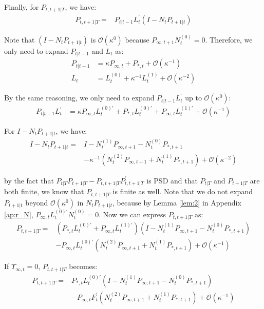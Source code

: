 \documentclass[10pt, titlepage]{article}
\numberwithin{equation}{section}
\begin{document}
Finally, for $P_{t,t+1|T}$, we have:
\begin{align*}
    P_{t,t+1|T} =& P_{t|t-1}L_t^{'}(I-N_tP_{t+1|t})
\end{align*}

Note that $(I-N_tP_{t+1|t})$ is $\mathcal{O}(\kappa^0)$ because $P_{\infty,t+1}N_{t}^{(0)}=0$. Therefore, we only need to expand $P_{t|t-1}$ and $L_t$ as:
\begin{align*}
    P_{t|t-1} &= \kappa P_{\infty,t} + P_{*,t} + \mathcal{O}(\kappa^{-1}) \\
    L_t &= L_t^{(0)} + \kappa^{-1}L_t^{(1)} + \mathcal{O}(\kappa^{-2})
\end{align*}

By the same reasoning, we only need to expand $P_{t|t-1}L_t^{'}$ up to $\mathcal{O}(\kappa^0)$:
\begin{align*}
    P_{t|t-1}L_t^{'} &= \kappa P_{\infty,t}L_t^{(0)'}+P_{*,t}L_t^{(0)'}+P_{\infty,t}L_t^{(1)'}+\mathcal{O}(\kappa^{-1})
\end{align*}

For $I-N_tP_{t+1|t}$, we have:
\begin{align*}
    I-N_tP_{t+1|t} =& I-N_t^{(1)}P_{\infty,t+1}-N_t^{(0)}P_{*,t+1} \\
    &-\kappa^{-1}(N_t^{(2)}P_{\infty,t+1}+N_t^{(1)}P_{*,t+1})+\mathcal{O}(\kappa^{-2})
\end{align*}

by the fact that $P_{t|T}P_{t+1|T}-P_{t,t+1|T}P_{t,t+1|T}^{'}$ is PSD and that $P_{t|T}$ and $P_{t+1|T}$ are both finite, we know that $P_{t,t+1|T}$ is finite as well. Note that we do not expand $P_{t+1|t}$ beyond $\mathcal{O}(\kappa^0)$ in $N_tP_{t+1|t}$, because by Lemma \ref{lem:2} in Appendix \ref{ap:r_N}, $P_{\infty,t}L_t^{(0)'}N_t^{(0)}=0$. Now we can express $P_{t,t+1|T}$ as:
\begin{align*}
    P_{t,t+1|T} =& (P_{*,t}L_t^{(0)'}+P_{\infty,t}L_t^{(1)'})(I-N_t^{(1)}P_{\infty,t+1}-N_t^{(0)}P_{*,t+1}) \\
    &- P_{\infty,t}L_t^{(0)'}(N_t^{(2)}P_{\infty,t+1}+N_t^{(1)}P_{*,t+1}) + \mathcal{O}(\kappa^{-1})
\end{align*}

If $\Upsilon_{\infty,t}=0$, $P_{t,t+1|T}$ becomes:
\begin{align*}
    P_{t,t+1|T} =& P_{*,t}L_t^{(0)'}(I-N_t^{(1)}P_{\infty,t+1}-N_t^{(0)}P_{*,t+1}) \\
    &- P_{\infty,t}F_t^{'}(N_t^{(2)}P_{\infty,t+1}+N_t^{(1)}P_{*,t+1}) + \mathcal{O}(\kappa^{-1})
\end{align*}
\end{document}
